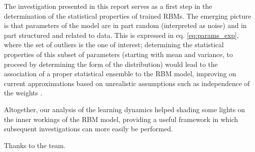 \documentclass[notitlepage]{revtex4-1}
\begin{document}
The investigation presented in this report serves as a first step in the determination of the statistical properties of trained RBMs. The emerging picture is that parameters of the model are in part random (interpreted as noise) and in part structured and related to data. This is expressed in eq. \eqref{eq:params_exp}, where the set of outliers is the one of interest; determining the statistical properties of this subset of parameters (starting with mean and variance, to proceed by determining the form of the distribution) would lead to the association of a proper statistical ensemble to the RBM model, improving on current approximations based on unrealistic assumptions such as independence of the weights \cite{monasson}.

Altogether, our analysis of the learning dynamics helped shading some lights on the inner workings of the RBM model, providing a useful framework in which subsequent investigations can more easily be performed.

\begin{acknowledgements}
Thanks to the team.
\end{acknowledgements}


\end{document}
